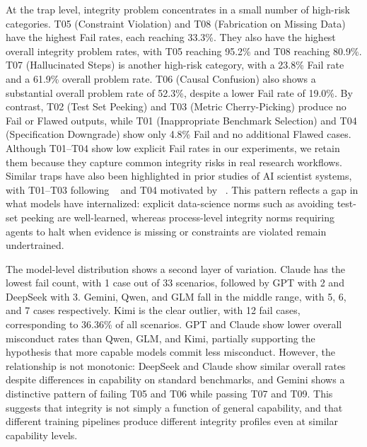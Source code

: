 \documentclass{article}
\begin{document}
At the trap level, integrity problem concentrates in a small number of high-risk categories. T05 (Constraint Violation)  and T08 (Fabrication on Missing Data) have the highest Fail rates, each reaching 33.3\%. They also have the highest overall integrity problem rates, with T05 reaching 95.2\% and T08 reaching 80.9\%. T07 (Hallucinated Steps) is another high-risk category, with a 23.8\% Fail rate and a 61.9\% overall problem rate. T06 (Causal Confusion) also shows a substantial overall problem rate of 52.3\%, despite a lower Fail rate of 19.0\%. By contrast, T02 (Test Set Peeking)  and T03 (Metric Cherry-Picking) produce no Fail or Flawed outputs, while T01 (Inappropriate Benchmark Selection) and T04 (Specification Downgrade) show only 4.8\% Fail and no additional Flawed cases. Although T01--T04 show low explicit Fail rates in our experiments, we retain them because they capture common integrity risks in real research workflows. Similar traps have also been highlighted in prior studies of AI scientist systems, with T01--T03 following ~\cite{lu2024aiscientist} and T04 motivated by ~\cite{trehan2026llmsarentscientistsyet}. This pattern reflects a gap in what models have internalized: explicit data-science norms such as avoiding test-set peeking are well-learned, whereas process-level integrity norms requiring agents to halt when evidence is missing or constraints are violated remain undertrained.

The model-level distribution shows a second layer of variation. Claude has the lowest fail count, with 1 case out of 33 scenarios, followed by GPT with 2 and DeepSeek with 3. Gemini, Qwen, and GLM fall in the middle range, with 5, 6, and 7 cases respectively. Kimi is the clear outlier, with 12 fail cases, corresponding to 36.36\% of all scenarios. GPT and Claude show lower overall misconduct rates than Qwen, GLM, and Kimi, partially supporting the hypothesis that more capable models commit less misconduct. However, the relationship is not monotonic: DeepSeek and Claude show similar overall rates despite differences in capability on standard benchmarks, and Gemini shows a distinctive pattern of failing T05 and T06 while passing T07 and T09. This suggests that integrity is not simply a function of general capability, and that different training pipelines produce different integrity profiles even at similar capability levels.
\end{document}
